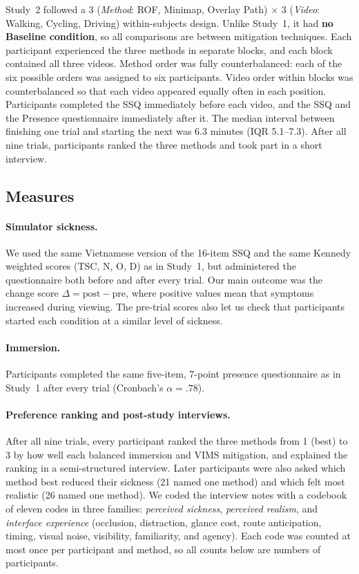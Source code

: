 Study~2 followed a 3 (\textit{Method}: ROF, Minimap, Overlay Path) $\times$ 3
(\textit{Video}: Walking, Cycling, Driving) within-subjects design. Unlike
Study~1, it had \textbf{no Baseline condition}, so all comparisons are between
mitigation techniques. Each participant experienced the three methods in
separate blocks, and each block contained all three videos. Method order was
fully counterbalanced: each of the six possible orders was assigned to six
participants. Video order within blocks was counterbalanced so that each video
appeared equally often in each position. Participants completed the SSQ
immediately before each video, and the SSQ and the Presence questionnaire
immediately after it. The median interval between finishing one trial and
starting the next was 6.3 minutes (IQR 5.1--7.3). After all nine trials,
participants ranked the three methods and took part in a short interview.

\subsection{Measures}

\paragraph{Simulator sickness.}
We used the same Vietnamese version of the 16-item SSQ and the same Kennedy
weighted scores (TSC, N, O, D) as in Study~1, but administered the
questionnaire both before and after every trial. Our main outcome was the
change score $\Delta = \text{post} - \text{pre}$, where positive values mean
that symptoms increased during viewing. The pre-trial scores also let us check
that participants started each condition at a similar level of sickness.

\paragraph{Immersion.}
Participants completed the same five-item, 7-point presence questionnaire as in
Study~1 after every trial (Cronbach's $\alpha = .78$).

\paragraph{Preference ranking and post-study interviews.}
After all nine trials, every participant ranked the three methods from 1 (best)
to 3 by how well each balanced immersion and VIMS mitigation, and explained the
ranking in a semi-structured interview. Later participants were also asked
which method best reduced their sickness (21 named one method) and which felt
most realistic (26 named one method). We coded the interview notes with a
codebook of eleven codes in three families: \emph{perceived sickness},
\emph{perceived realism}, and \emph{interface experience} (occlusion,
distraction, glance cost, route anticipation, timing, visual noise, visibility,
familiarity, and agency). Each code was counted at most once per participant
and method, so all counts below are numbers of participants.

